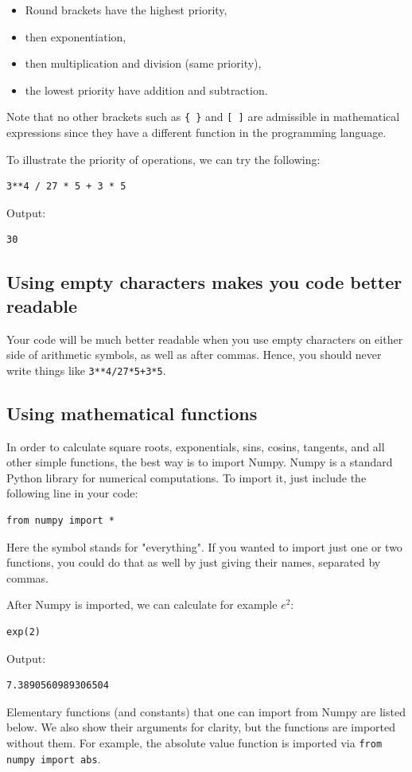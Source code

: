 \documentclass[article,A4,12pt]{llncs}
\begin{document}
\begin{itemize} 
\item Round brackets have the highest priority,
\item then exponentiation, 
\item then multiplication and division (same priority),
\item the lowest priority have addition and subtraction.
\end{itemize}
Note that no other brackets such as {\tt \{ \}} and {\tt [ ]} are 
admissible in mathematical expressions since they have a different 
function in the programming language.

To illustrate the priority of operations, we can try the following:

\begin{verbatim}
3**4 / 27 * 5 + 3 * 5
\end{verbatim}
Output:

\begin{verbatim}
30
\end{verbatim}
\subsection{Using empty characters makes you code better readable}
Your code will be much better readable when you use empty
characters on either side of arithmetic symbols, as well as 
after commas. Hence, you should never write things like {\tt 3**4/27*5+3*5}.

\subsection{Using mathematical functions}

In order to calculate square roots, exponentials, sins, cosins, tangents, and all other 
simple functions, the best way is to import Numpy. Numpy is a standard Python library 
for numerical computations. To import it, just include the following 
line in your code:

\begin{verbatim}
from numpy import *
\end{verbatim}
Here the symbol {\tt *} stands for "everything". If you wanted to import just one or two 
functions, you could do that as well by just giving their names, separated by commas. 

After Numpy is imported, we can calculate for example $e^2$:

\begin{verbatim}
exp(2)
\end{verbatim}
Output:
\begin{verbatim}
7.3890560989306504
\end{verbatim}
Elementary functions (and constants) that one can import from Numpy are listed
below. We also show their arguments for clarity, but the functions are imported without 
them. For example, the absolute value function is imported via {\tt from numpy import abs}.\\
\end{document}
